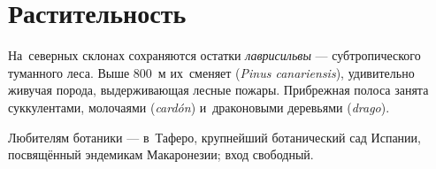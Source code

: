 \section{Растительность}

На~северных склонах сохраняются остатки \textit{лаврисильвы} ---
субтропического туманного леса. Выше 800~м их~сменяет
 (\textit{Pinus canariensis}),
удивительно живучая порода, выдерживающая лесные пожары.
Прибрежная полоса занята суккулентами, молочаями
(\textit{cardón}) и~драконовыми деревьями (\textit{drago}).

\begin{detour}
Любителям ботаники ---  в~Таферо, крупнейший
ботанический сад Испании, посвящённый эндемикам
Макаронезии; вход свободный.
\end{detour}
